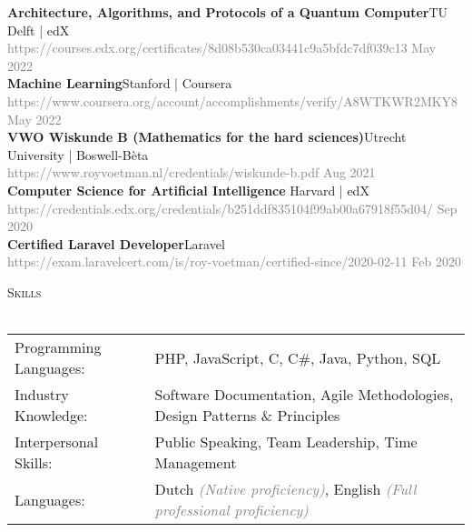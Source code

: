 \documentclass[a4paper]{article}
\newcommand{\lineunder} {
    \vspace*{-8pt} \\
    \hspace*{-18pt} \hrulefill \\
}
\newcommand{\header} [1] {
    {\hspace*{-18pt}\vspace*{6pt} \textsc{#1}}
    \vspace*{-6pt} \lineunder
}
\begin{document}
\textbf{Architecture, Algorithms, and Protocols of a Quantum Computer}\hfill TU Delft | edX\\
 \textcolor{gray}{https://courses.edx.org/certificates/8d08b530ca03441c9a5bfdc7df039c13} \hfill \textcolor{gray}{May 2022}\\
 \vspace{2mm}
 \textbf{Machine Learning}\hfill Stanford | Coursera\\
 \textcolor{gray}{https://www.coursera.org/account/accomplishments/verify/A8WTKWR2MKY8} \hfill \textcolor{gray}{May 2022}\\
 \vspace{2mm}
 \textbf{VWO Wiskunde B (Mathematics for the hard sciences)}\hfill Utrecht University | Boswell-Bèta\\
 \textcolor{gray}{https://www.royvoetman.nl/credentials/wiskunde-b.pdf}
 \hfill \textcolor{gray}{Aug 2021}\\
\vspace{2mm}
\textbf{Computer Science for Artificial Intelligence }\hfill Harvard | edX\\
\textcolor{gray}{https://credentials.edx.org/credentials/b251ddf835104f99ab00a67918f55d04/} \hfill \textcolor{gray}{Sep 2020}\\
\vspace{2mm}
\textbf{Certified Laravel Developer}\hfill Laravel\\
\textcolor{gray}{https://exam.laravelcert.com/is/roy-voetman/certified-since/2020-02-11} \hfill \textcolor{gray}{Feb 2020}\\
\vspace{2mm}

\vspace{5mm}

\header{Skills}
\vspace{2mm}
\begin{tabular}{l l}

	Programming Languages:   & PHP, JavaScript, C, C\#, Java, Python, SQL
	\vspace{1mm}\\
    
	Industry Knowledge:      & Software Documentation, Agile Methodologies, Design Patterns \& Principles
	\vspace{1mm}\\
	
	Interpersonal Skills:    & Public Speaking, Team Leadership, Time Management
	\vspace{1mm}\\
	
    Languages:               & Dutch \textcolor{gray}{\emph{(Native proficiency)}}, English \textcolor{gray}{\emph{(Full professional proficiency)}}\\
    
\end{tabular}
\vspace{2mm}
\end{document}
